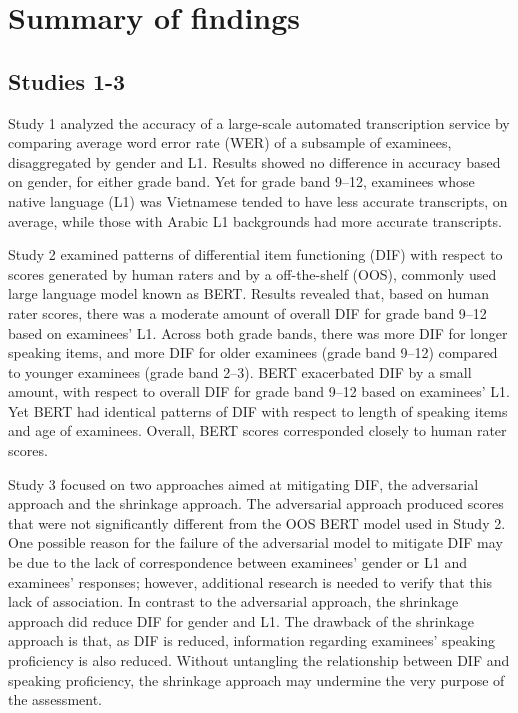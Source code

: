 \documentclass [PhD] {uclathes}
\begin{document}
\section{Summary of findings}

\subsection{Studies 1-3}

Study 1 analyzed the accuracy of a large-scale automated transcription service by comparing average word error rate (WER) of a subsample of examinees, disaggregated by gender and L1. Results showed no difference in accuracy based on gender, for either grade band. Yet for grade band 9–12, examinees whose native language (L1) was Vietnamese tended to have less accurate transcripts, on average, while those with Arabic L1 backgrounds had more accurate transcripts. 

Study 2 examined patterns of differential item functioning (DIF) with respect to scores generated by human raters and by a off-the-shelf (OOS), commonly used large language model known as BERT. Results revealed that, based on human rater scores, there was a moderate amount of overall DIF for grade band 9–12 based on examinees’ L1. Across both grade bands, there was more DIF for longer speaking items, and more DIF for older examinees (grade band 9–12) compared to younger examinees (grade band 2–3). BERT exacerbated DIF by a small amount, with respect to overall DIF for grade band 9–12 based on examinees’ L1. Yet BERT had identical patterns of DIF with respect to length of speaking items and age of examinees. Overall, BERT scores corresponded closely to human rater scores. 

Study 3 focused on two approaches aimed at mitigating DIF, the adversarial approach and the shrinkage approach. The adversarial approach produced scores that were not significantly different from the OOS BERT model used in Study 2. One possible reason for the failure of the adversarial model to mitigate DIF may be due to the lack of correspondence between examinees’ gender or L1 and examinees' responses; however, additional research is needed to verify that this lack of association. In contrast to the adversarial approach, the shrinkage approach did reduce DIF for gender and L1. The drawback of the shrinkage approach is that, as DIF is reduced, information regarding examinees’ speaking proficiency is also reduced. Without untangling the relationship between DIF and speaking proficiency, the shrinkage approach may undermine the very purpose of the assessment. 
\end{document}
